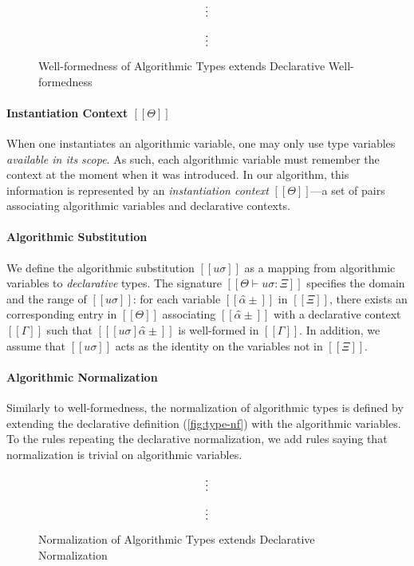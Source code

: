 \begin{figure}[t]
  \begin{minipage}{0.49\textwidth}
  $$\vcenter{\hbox{\vdots}}$$
  \ottusedrule{\ottdruleWFATPUVarLabeled{}}
  \end{minipage}
  \begin{minipage}{0.49\textwidth}
  $$\vcenter{\hbox{\vdots}}$$
  \ottusedrule{\ottdruleWFATNUVarLabeled{}}
  \end{minipage}
\caption{Well-formedness of Algorithmic Types extends Declarative Well-formedness}
\label{fig:algo-wf}
\end{figure}

\paragraph*{Instantiation Context $[[Θ]]$}
When one instantiates an algorithmic variable, one may only use type variables
\emph{available in its scope}. As such, each algorithmic variable must remember
the context at the moment when it was introduced. In our algorithm, this
information is represented by an \emph{instantiation context} $[[Θ]]$---a set of
pairs associating algorithmic variables and declarative contexts.

\paragraph*{Algorithmic Substitution}
We define the algorithmic substitution $[[uσ]]$ as a mapping from algorithmic
variables to \emph{declarative} types. The signature $[[Θ ⊢ uσ : Ξ]]$
specifies the domain and the range of $[[uσ]]$: for each variable $[[α̂±]]$
in $[[Ξ]]$, there exists an corresponding entry in $[[Θ]]$ associating 
$[[α̂±]]$ with a declarative context $[[Γ]]$ such that $[[ [uσ]α̂± ]]$
is well-formed in $[[Γ]]$. In addition, we assume that $[[uσ]]$
acts as the identity on the variables not in $[[Ξ]]$.


\paragraph*{Algorithmic Normalization}
Similarly to well-formedness, the normalization of algorithmic types is defined
by extending the declarative definition (\cref{fig:type-nf}) with the
algorithmic variables. To the rules repeating the declarative normalization, we
add rules saying that normalization is trivial on algorithmic variables.

\begin{figure}[t]
\begin{minipage}{0.49\textwidth}
  $$\vcenter{\hbox{\vdots}}$$
  \ottusedrule{\ottdruleNrmPUVar{}}
\end{minipage}
\hfill
\begin{minipage}{0.49\textwidth}
  $$\vcenter{\hbox{\vdots}}$$
  \ottusedrule{\ottdruleNrmNUVar{}}
\end{minipage}
\caption{Normalization of Algorithmic Types extends Declarative Normalization}
\label{fig:algo-nf}
\end{figure}

